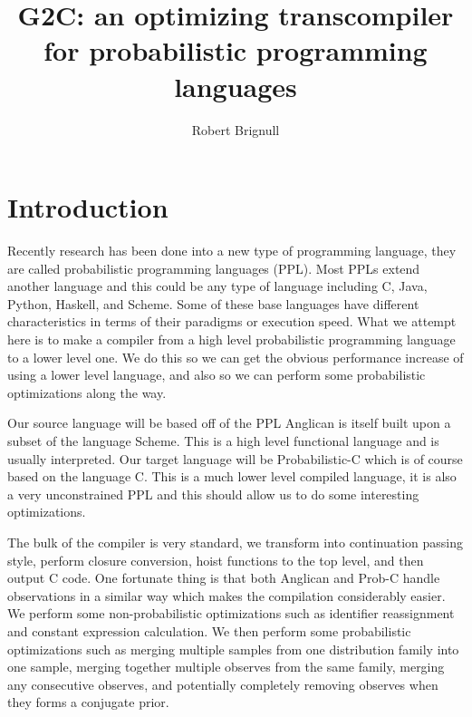 \documentclass[a4paper]{article}
\title{G2C: an optimizing transcompiler for probabilistic programming languages}
\author{Robert Brignull}
\date{ }
\begin{document}
\maketitle


\section{Introduction}

Recently research has been done into a new type of programming language, they are called probabilistic programming languages (PPL). Most PPLs extend another language and this could be any type of language including C, Java, Python, Haskell, and Scheme. Some of these base languages have different characteristics in terms of their paradigms or execution speed. What we attempt here is to make a compiler from a high level probabilistic programming language to a lower level one. We do this so we can get the obvious performance increase of using a lower level language, and also so we can perform some probabilistic optimizations along the way.

Our source language will be based off of the PPL Anglican is itself built upon a subset of the language Scheme. This is a high level functional language and is usually interpreted. Our target language will be Probabilistic-C which is of course based on the language C. This is a much lower level compiled language, it is also a very unconstrained PPL and this should allow us to do some interesting optimizations.

The bulk of the compiler is very standard, we transform into continuation passing style, perform closure conversion, hoist functions to the top level, and then output C code. One fortunate thing is that both Anglican and Prob-C handle observations in a similar way which makes the compilation considerably easier. We perform some non-probabilistic optimizations such as identifier reassignment and constant expression calculation. We then perform some probabilistic optimizations such as merging multiple samples from one distribution family into one sample, merging together multiple observes from the same family, merging any consecutive observes, and potentially completely removing observes when they forms a conjugate prior.
\end{document}
